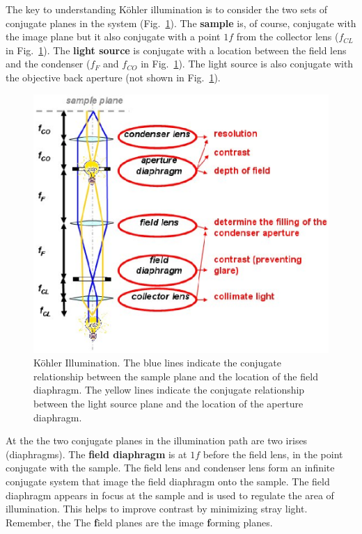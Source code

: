\documentclass[a4paper]{report}
\begin{document}
The key to understanding K\"{o}hler illumination is to consider the two sets of conjugate planes in the system (Fig.~\ref{fig:koehler}). 
The \textbf{sample} is, of course, conjugate with the image plane but it also conjugate with a point $1f$ from the collector lens ($f_{CL}$ in Fig.~\ref{fig:koehler}). 
The \textbf{light source} is conjugate with a location between the field lens and the condenser ($f_F$ and $f_{CO}$ in Fig.~\ref{fig:koehler}). 
The light source is also conjugate with the objective back aperture (not shown in Fig.~\ref{fig:koehler}). 

\begin{figure}[ht]
\center
\includegraphics[width=5in]{koehler.eps}
\caption{K\"{o}hler Illumination. 
The blue lines indicate the conjugate relationship between the sample plane and the location of the field diaphragm.
The yellow lines indicate the conjugate relationship between the light source plane and the location of the aperture diaphragm.
}
\label{fig:koehler}
\end{figure}

At the the two conjugate planes in the illumination path are two irises (diaphragms). 
The \textbf{field diaphragm} is at $1f$ before the field lens, in the point conjugate with the sample. 
The field lens and condenser lens form an infinite conjugate system that image the field diaphragm onto the sample. 
The field diaphragm appears in focus at the sample and is used to regulate the area of illumination. 
This helps to improve contrast by minimizing stray light. 
Remember, the The \textbf{f}ield planes are the image \textbf{f}orming planes. 
\end{document}
